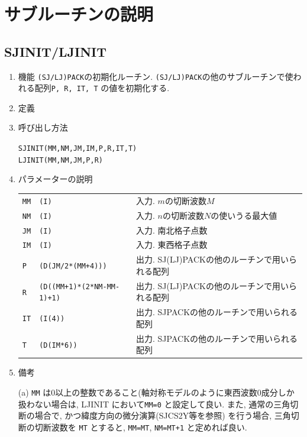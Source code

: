 \documentclass[a4j]{jarticle}
\begin{document}

\section{サブルーチンの説明}

\subsection{SJINIT/LJINIT}

\begin{enumerate}

\item 機能
{\tt (SJ/LJ)PACK}の初期化ルーチン.
{\tt (SJ/LJ)PACK}の他のサブルーチンで使われる配列{\tt P, R, IT, T}
の値を初期化する.

\item 定義

\item 呼び出し方法 
    
{\tt SJINIT(MM,NM,JM,IM,P,R,IT,T)}\\
{\tt LJINIT(MM,NM,JM,P,R)}
  
\item パラメーターの説明 
    
\begin{tabular}{lll}
{\tt MM} & {\tt (I)} & 入力. $m$の切断波数$M$\\
{\tt NM} & {\tt (I)} & 入力. $n$の切断波数$N$の使いうる最大値\\
{\tt JM} & {\tt (I)} & 入力. 南北格子点数\\
{\tt IM} & {\tt (I)} & 入力. 東西格子点数\\
{\tt P}  & {\tt (D(JM/2*(MM+4)))} 
      & 出力. SJ(LJ)PACKの他のルーチンで用いられる配列\\
{\tt R}  & {\tt (D((MM+1)*(2*NM-MM-1)+1)} 
      & 出力. SJ(LJ)PACKの他のルーチンで用いられる配列\\
{\tt IT}  & {\tt (I(4))}    & 出力. SJPACKの他のルーチンで用いられる配列\\
{\tt T}   & {\tt (D(IM*6))} & 出力. SJPACKの他のルーチンで用いられる配列
\end{tabular}

\item 備考

(a) {\tt MM} は0以上の整数であること(軸対称モデルのように東西波数0成分しか
     扱わない場合は, LJINIT において{\tt MM=0} と設定して良い.
     また, 通常の三角切断の場合で, かつ緯度方向の微分演算(SJCS2Y等を参照)
     を行う場合, 三角切断の切断波数を {\tt MT} とすると,
     {\tt MM=MT},  {\tt NM=MT+1} と定めれば良い.
     

\end{enumerate}
\end{document}
